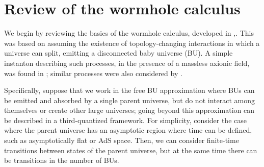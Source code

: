 \documentclass[12pt]{article}
\numberwithin{equation}{section}
\begin{document}
\section{Review of the wormhole calculus}

We begin by reviewing the basics of the wormhole calculus, developed in \cite{GiStInc},\cite{Cole}. This was based on assuming the existence of topology-changing interactions in which a universe can split, emitting a disconnected baby universe (BU).  A simple instanton describing such processes, in the presence of a massless axionic field, was found in \cite{GiStAx}; similar processes were also considered by \cite{Hawking:1987mz, Lavrelashvili:1987jg, Klebanov:1988eh, Rubakov:1988jf, Rey:1989mg, ColeCC,Polchinski:1994zs, Maldacena:2004rf, ArkaniHamed:2007js}.  

Specifically, suppose that we work in the free BU approximation where BUs can be emitted and absorbed by a single parent universe, but do not interact among themselves or create other large universes; going beyond this approximation can be described in a third-quantized framework\cite{GiSt3Q}.  For simplicity, consider the case where the parent universe has an asymptotic region where time can be defined, such as asymptotically flat or AdS space.  Then, we can consider finite-time transitions between states of the parent universe, but at the same time there can be transitions in the number of BUs.
\end{document}
